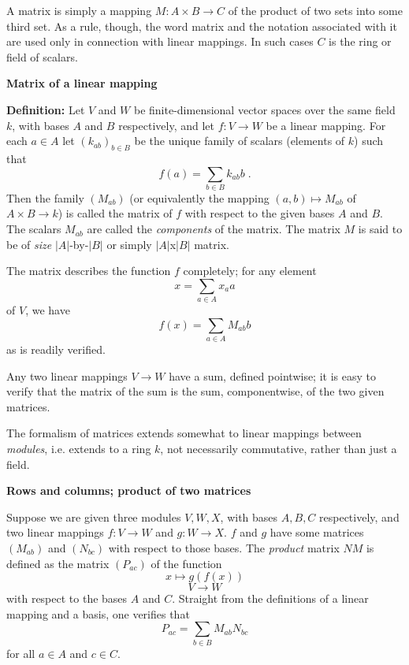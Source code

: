 \documentclass{article}
\newcommand*{\abs}[1]{\lvert #1\rvert}
\begin{document}
 
 
 
 

A matrix is simply a mapping $M\colon A\times B\to C$ of the product of two
sets into some third set.
As a rule, though, the word matrix and the notation associated with it
are used only in connection with linear mappings.
In such cases $C$ is the ring or field of scalars.

\textbf{Matrix of a linear mapping}

\textbf{Definition: }Let $V$ and $W$ be finite-dimensional vector
spaces over the same field $k$, with bases $A$ and $B$ respectively,
and let $f\colon V\to W$ be a linear mapping.
For each $a\in A$ let $(k_{ab})_{b\in B}$ be the unique family of scalars
(elements of $k$) such that
$$f(a)=\sum_{b\in B}k_{ab}b\;.$$
Then the family $(M_{ab})$ (or equivalently the mapping $(a,b)\mapsto M_{ab}$
of $A\times B\to k$)
is called the matrix of $f$ with respect to the given bases $A$ and $B$.
The scalars $M_{ab}$ are called the \emph{components} of the matrix. The matrix $M$ is said to be of \emph{size} $\abs{A}$-by-$\abs{B}$ or simply $\abs{A}$x$\abs{B}$ matrix.

The matrix describes the function $f$ completely; for any element
$$x=\sum_{a\in A}x_aa$$
of $V$, we have
$$f(x)=\sum_{a\in A}M_{ab}b$$
as is readily verified.

Any two linear mappings $V\to W$ have a sum, defined pointwise; it
is easy to verify that the matrix of the sum is the sum, componentwise,
of the two given matrices.

The formalism of matrices extends somewhat to linear mappings between
\emph{modules}, i.e. extends to a ring $k$, not necessarily commutative,
rather than just a field.

\textbf{Rows and columns; product of two matrices}

Suppose we are given three modules $V,W,X$, with bases $A,B,C$ respectively,
and two linear mappings $f\colon V\to W$ and $g\colon W\to X$.
$f$ and $g$ have some matrices $(M_{ab})$ and $(N_{bc})$ with respect to
those bases. The \emph{product} matrix $NM$ is defined as the matrix
$(P_{ac})$ of the function
$$x\mapsto g(f(x))$$
$$V\to W$$
with respect to the bases $A$ and $C$. Straight from the definitions
of a linear mapping and a basis, one verifies that
\begin{equation} \label{eq:prodcomp}
P_{ac}=\sum_{b\in B}M_{ab}N_{bc}
\end{equation}
for all $a\in A$ and $c\in C$.
\end{document}
